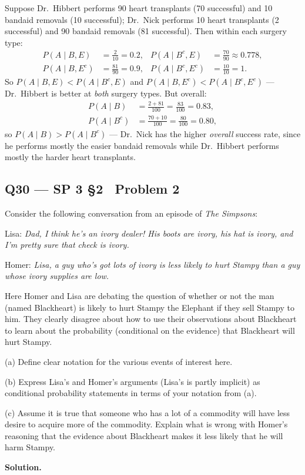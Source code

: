 \documentclass[11pt]{article}
\begin{document}
Suppose Dr.\ Hibbert performs 90 heart transplants (70 successful) and 10 bandaid removals (10 successful); Dr.\ Nick performs 10 heart transplants (2 successful) and 90 bandaid removals (81 successful). Then within each surgery type:
\begin{align*}
P(A\mid B,E) &= \frac{2}{10}=0.2, & P(A\mid B^c,E) &= \frac{70}{90}\approx 0.778,\\
P(A\mid B,E^c) &= \frac{81}{90} = 0.9, & P(A\mid B^c,E^c) &= \frac{10}{10}=1.
\end{align*}
So $P(A\mid B,E) < P(A\mid B^c,E)$ and $P(A\mid B,E^c) < P(A\mid B^c,E^c)$ — Dr.\ Hibbert is better at \emph{both} surgery types. But overall:
\begin{align*}
P(A\mid B) &= \frac{2+81}{100} = \frac{83}{100} = 0.83, \\
P(A\mid B^c) &= \frac{70+10}{100} = \frac{80}{100} = 0.80,
\end{align*}
so $P(A\mid B) > P(A\mid B^c)$ — Dr.\ Nick has the higher \emph{overall} success rate, since he performs mostly the easier bandaid removals while Dr.\ Hibbert performs mostly the harder heart transplants.

\subsection*{Q30 --- SP 3 \S2 \textperiodcentered\ Problem 2}
\begin{qbox}
Consider the following conversation from an episode of \textit{The Simpsons}:

Lisa: \textit{Dad, I think he's an ivory dealer! His boots are ivory, his hat is ivory, and I'm pretty sure that check is ivory.}

Homer: \textit{Lisa, a guy who's got lots of ivory is less likely to hurt Stampy than a guy whose ivory supplies are low.}

Here Homer and Lisa are debating the question of whether or not the man (named Blackheart) is likely to hurt Stampy the Elephant if they sell Stampy to him. They clearly disagree about how to use their observations about Blackheart to learn about the probability (conditional on the evidence) that Blackheart will hurt Stampy.

(a) Define clear notation for the various events of interest here.

(b) Express Lisa's and Homer's arguments (Lisa's is partly implicit) as conditional probability statements in terms of your notation from (a).

(c) Assume it is true that someone who has a lot of a commodity will have less desire to acquire more of the commodity. Explain what is wrong with Homer's reasoning that the evidence about Blackheart makes it less likely that he will harm Stampy.
\end{qbox}
\textbf{Solution.}
\end{document}
